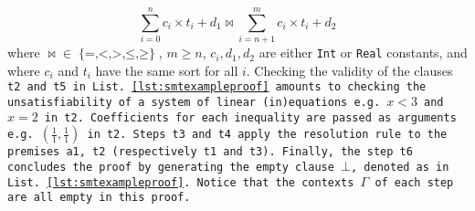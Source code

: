 \begin{equation}
\sum_{i=0}^{n}c_i\times{}t_i + d_1\bowtie \sum_{i=n+1}^{m} c_i\times{}t_i + d_2
\label{eqn:inequality}
\end{equation}
%
where $\mathop{\bowtie} \mathrel{\in} \mathop{\{=, <, >, \leq, \geq\}}$, $m\geq n$, $c_i, d_1, d_2$ are either \lstinline[language=SMT,basicstyle=\ttfamily\footnotesize]{Int} or \lstinline[language=SMT,basicstyle=\ttfamily\footnotesize]{Real}
constants, and where $c_i$ and $t_i$ have the same sort for all $i$.
Checking the validity of the clauses \tt{t2} and \tt{t5} in List.~\ref{lst:smtexampleproof} amounts to checking the unsatisfiability of a system of linear (in)equations e.g. $x < 3$ and $x = 2$ in \tt{t2}.
Coefficients for each inequality are passed as arguments e.g. $(\frac{1}{1},\frac{1}{1})$ in \tt{t2}.
Steps \tt{t3} and \tt{t4} apply the \colorbox{purple!30}{\texttt{resolution}} rule to the premises \tt{a1}, \tt{t2} (respectively \tt{t1} and \tt{t3}).
Finally, the step \texttt{t6} concludes the proof by generating the empty clause $\bot$, denoted as  in List.~\ref{lst:smtexampleproof}.
Notice that the contexts \colorbox{blue!30}{$\Gamma$} of each step are all empty in this proof.

